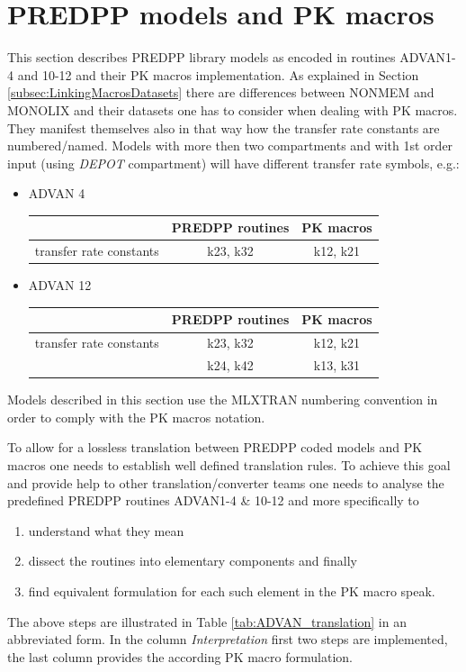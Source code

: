 \section{PREDPP models and PK macros}
\label{subsec:PREDPPinMACROS}
This section describes PREDPP library models as encoded in routines ADVAN1-4 and 10-12 
and their PK macros implementation. 
As explained in Section \ref{subsec:LinkingMacrosDatasets} there are differences between 
NONMEM and MONOLIX and their datasets one has to consider when dealing with PK macros.
They manifest themselves also in that way how the transfer rate constants are numbered/named. 
Models with more then two compartments and with 1st order input (using \emph{DEPOT} 
compartment) will have different transfer rate symbols, e.g.:
\begin{itemize}
\item
ADVAN 4
\begin{table}[ht]
\centering
\small
\renewcommand{\arraystretch}{1.1}%
\begin{tabular}{lcc}
  \hline
  \hline
				 	& PREDPP routines 	& PK macros \\
  \hline
transfer rate constants 	& k23, k32 		& k12, k21 \\
\hline
\end{tabular}
\end{table}
\item
ADVAN 12
\begin{table}[h!]
\centering
\small
\renewcommand{\arraystretch}{1.1}%
\begin{tabular}{lcc}
  \hline
  \hline
				 	& PREDPP routines 	& PK macros \\
  \hline
transfer rate constants 	& k23, k32 		& k12, k21  \\
					& k24, k42 		& k13, k31  \\
\hline
\end{tabular}
\end{table}
\end{itemize}
Models described in this section use the MLXTRAN numbering convention in order to comply
with the PK macros notation.

To allow for a lossless translation between PREDPP coded models and PK macros one needs
to establish well defined translation rules. To achieve this goal and provide help to other 
translation/converter teams one needs to analyse the predefined PREDPP routines ADVAN1-4 \& 10-12
and more specifically to
\begin{enumerate}
\item
understand what they mean
\item
dissect the routines into elementary components and finally 
\item
find equivalent formulation for each such element in the PK macro speak.
\end{enumerate}
The above steps are illustrated in Table \ref{tab:ADVAN_translation} in an abbreviated form. 
In the column \emph{Interpretation} first two steps are implemented, 
the last column provides the according PK macro formulation.

